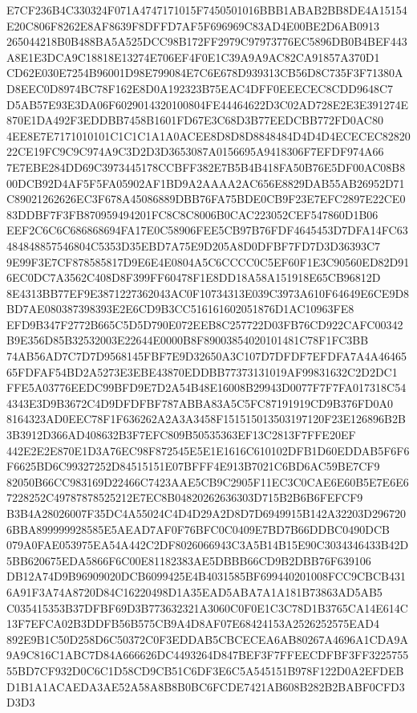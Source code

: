 \documentclass[UTF8,fontset=fandol,zihao=-4,a4paper]{ctexart}
\begin{document}
{{E7CF236B4C330324F071A4747171015F7450501016BBB1ABAB2BB8DE4A15154E20C806F8262E8AF8639F8DFFD7AF5F696969C83AD4E00BE2D6AB0913
265044218B0B488BA5A525DCC98B172FF2979C97973776EC5896DB0B4BEF443A8E1E3DCA9C18818E13274E706EF4F0E1C39A9A9AC82CA91857A370D1
CD62E030E7254B96001D98E799084E7C6E678D939313CB56D8C735F3F71380AD8EEC0D8974BC78F162E8D0A192323B75EAC4DFF0EEECEC8CDD9648C7
D5AB57E93E3DA06F6029014320100804FE44464622D3C02AD728E2E3E391274E870E1DA492F3EDDBB7458B1601FD67E3C68D3B77EEDCBB772FD0AC80
4EE8E7E7171010101C1C1C1A1A0ACEE8D8D8D8848484D4D4D4ECECEC8282022CE19FC9C9C974A9C3D2D3D3653087A0156695A9418306F7EFDF974A66
7E7EBE284DD69C3973445178CCBFF382E7B5B4B418FA50B76E5DF00AC08B800DCB92D4AF5F5FA05902AF1BD9A2AAAA2AC656E8829DAB55AB26952D71
C89021262626EC3F678A45086889DBB76FA75BDE0CB9F23E7EFC2897E22CE083DDBF7F3FB870959494201FC8C8C8006B0CAC223052CEF547860D1B06
EEF2C6C6C686868694FA17E0C58906FEE5CB97B76FDF4645453D7DFA14FC63484848857546804C5353D35EBD7A75E9D205A8D0DFBF7FD7D3D36393C7
9E99F3E7CF878585817D9E6E4E0804A5C6CCCC0C5EF60F1E3C90560ED82D916EC0DC7A3562C408D8F399FF60478F1E8DD18A58A151918E65CB96812D
8E4313BB77EF9E3871227362043AC0F10734313E039C3973A610F64649E6CE9D8BD7AE080387398393E2E6CD9B3CC516161602051876D1AC10963FE8
EFD9B347F2772B665C5D5D790E072EEB8C257722D03FB76CD922CAFC00342B9E356D85B32532003E22644E0000B8F89003854020101481C78F1FC3BB
74AB56AD7C7D7D9568145FBF7E9D32650A3C107D7DFDF7EFDFA7A4A4646565FDFAF54BD2A5273E3EBE43870EDDBB77373131019AF99831632C2D2DC1
FFE5A03776EEDC99BFD9E7D2A54B48E16008B29943D0077F7F7FA017318C544343E3D9B3672C4D9DFDFBF787ABBA83A5C5FC87191919CD9B376FD0A0
8164323AD0EEC78F1F636262A2A3A3458F151515013503197120F23E126896B2B3B3912D366AD408632B3F7EFC809B50535363EF13C2813F7FFE20EF
442E2E2E870E1D3A76EC98F872545E5E1E1616C610102DFB1D60EDDAB5F6F6F6625BD6C99327252D84515151E07BFFF4E913B7021C6BD6AC59BE7CF9
82050B66CC983169D22466C7423AAE5CB9C2905F11EC3C0CAE6E60B5E7E6E67228252C49787878525212E7EC8B04820262636303D715B2B6B6FEFCF9
B3B4A28026007F35DC4A55024C4D4D29A2D8D7D6949915B142A32203D2967206BBA899999928585E5AEAD7AF0F76BFC0C0409E7BD7B66DDBC0490DCB
079A0FAE053975EA54A442C2DF8026066943C3A5B14B15E90C3034346433B42D5BB620675EDA5866F6C00E81182383AE5DBBB66CD9B2DBB76F639106
DB12A74D9B96909020DCB6099425E4B4031585BF699440201008FCC9CBCB4316A91F3A74A8720D84C16220498D1A35EAD5ABA7A1A181B73863AD5AB5
C035415353B37DFBF69D3B773632321A3060C0F0E1C3C78D1B3765CA14E614C13F7EFCA02B3DDFB56B575CB9A4D8AF07E68424153A2526252575EAD4
892E9B1C50D258D6C50372C0F3EDDAB5CBCECEA6AB80267A4696A1CDA9A9A9C816C1ABC7D84A666626DC4493264D847BEF3F7FFEECDFBF3FF3225755
55BD7CF932D0C6C1D58CD9CB51C6DF3E6C5A545151B978F122D0A2EFDEBD1B1A1ACAEDA3AE52A58A8B8B0BC6FCDE7421AB608B282B2BABF0CFD3D3D3
}}
\end{document}
